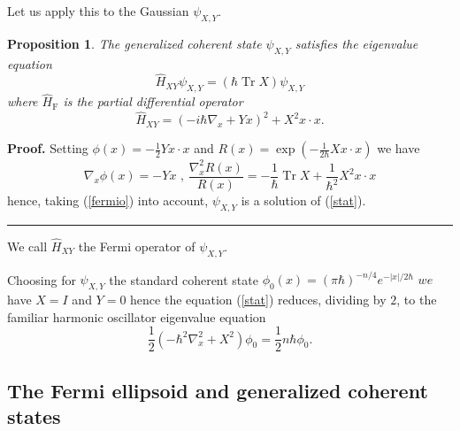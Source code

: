 \documentclass[11pt]{article}%
\newtheorem{proposition}[theorem]{Proposition}
\newenvironment{proof}[1][Proof]{\noindent\textbf{#1.} }{\ \rule{0.5em}{0.5em}}
\begin{document}
Let us apply this to the Gaussian $\psi_{X,Y}$.

\begin{proposition}
The generalized coherent state $\psi_{X,Y}$ satisfies the eigenvalue equation%
\begin{equation}
\widehat{H}_{XY}\psi_{X,Y}=(\hbar\operatorname*{Tr}X)\psi_{X,Y} \label{stat}%
\end{equation}
where $\widehat{H}_{\mathrm{F}}$ is the partial differential operator
\begin{equation}
\widehat{H}_{XY}=(-i\hbar\nabla_{x}+Yx)^{2}+X^{2}x\cdot x. \label{pdo}%
\end{equation}

\end{proposition}

\begin{proof}
Setting $\phi(x)=-\frac{1}{2}Yx\cdot x$ and $R(x)=\exp\left(  -\frac{1}%
{2\hbar}Xx\cdot x\right)  $ we have
\begin{equation}
\nabla_{x}\phi(x)=-Yx\text{ \ , \ }\frac{\nabla_{x}^{2}R(x)}{R(x)}=-\frac
{1}{\hbar}\operatorname*{Tr}X+\frac{1}{\hbar^{2}}X^{2}x\cdot x \label{tr}%
\end{equation}
hence, taking (\ref{fermio}) into account, $\psi_{X,Y}$ is a solution of
(\ref{stat}).
\end{proof}

We call $\widehat{H}_{XY}$ the Fermi operator of $\psi_{X,Y}$.

Choosing for $\psi_{X,Y}$ the standard coherent state $\phi_{0}(x)=(\pi
\hbar)^{-n/4}e^{-|x|/2\hbar}$ $we$ have $X=I$ and $Y=0$ hence the equation
(\ref{stat}) reduces, dividing by $2$, to the familiar harmonic oscillator
eigenvalue equation%
\[
\frac{1}{2}(-\hbar^{2}\nabla_{x}^{2}+X^{2})\phi_{0}=\frac{1}{2}n\hbar\phi
_{0}.
\]


\subsection{The Fermi ellipsoid and generalized coherent states}
\end{document}

